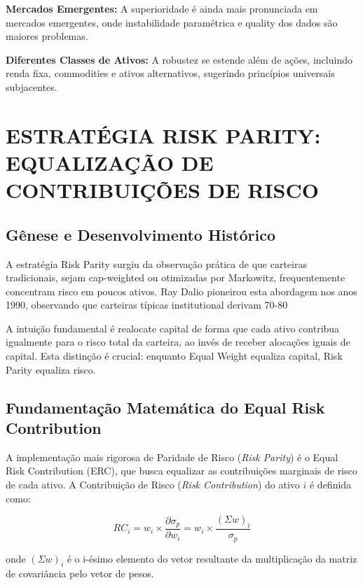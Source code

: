 \textbf{Mercados Emergentes:} A superioridade é ainda mais pronunciada em mercados emergentes, onde instabilidade paramétrica e quality dos dados são maiores problemas.

\textbf{Diferentes Classes de Ativos:} A robustez se estende além de ações, incluindo renda fixa, commodities e ativos alternativos, sugerindo princípios universais subjacentes.

\section{ESTRATÉGIA RISK PARITY: EQUALIZAÇÃO DE CONTRIBUIÇÕES DE RISCO}

\subsection{Gênese e Desenvolvimento Histórico}

A estratégia Risk Parity surgiu da observação prática de que carteiras tradicionais, sejam cap-weighted ou otimizadas por Markowitz, frequentemente concentram risco em poucos ativos. Ray Dalio pioneirou esta abordagem nos anos 1990, observando que carteiras típicas institutional derivam 70-80%

A intuição fundamental é realocate capital de forma que cada ativo contribua igualmente para o risco total da carteira, ao invés de receber alocações iguais de capital. Esta distinção é crucial: enquanto Equal Weight equaliza capital, Risk Parity equaliza risco.

\subsection{Fundamentação Matemática do Equal Risk Contribution}

A implementação mais rigorosa de Paridade de Risco (\textit{Risk Parity}) é o Equal Risk Contribution (ERC), que busca equalizar as contribuições marginais de risco de cada ativo. A Contribuição de Risco (\textit{Risk Contribution}) do ativo $i$ é definida como:

\begin{equation}
RC_i = w_i \times \frac{\partial \sigma_p}{\partial w_i} = w_i \times \frac{(\Sigma w)_i}{\sigma_p}
\end{equation}

onde $(\Sigma w)_i$ é o i-ésimo elemento do vetor resultante da multiplicação da matriz de covariância pelo vetor de pesos.


